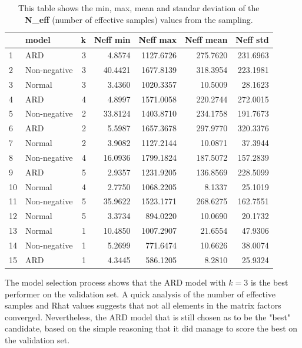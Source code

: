 \documentclass[12pt]{article}
\begin{document}
    \begin{table}[H]
        \centering
        \caption{This table shows the min, max, mean and standar deviation of the \textbf{N\_eff} (number of effective samples) values from the sampling.}
        \begin{tabular}{llr|rr|rr}
            \toprule
            {} &         model &  k &  Neff min &  Neff max &  Neff mean &  Neff std \\
            \midrule
            1  &           ARD &  3 &    4.8574 & 1127.6726 &   275.7620 &  231.6963 \\
            2  &  Non-negative &  3 &   40.4421 & 1677.8139 &   318.3954 &  223.1981 \\
            3  &        Normal &  3 &    3.4360 & 1020.3357 &    10.5009 &   28.1623 \\
            4  &           ARD &  4 &    4.8997 & 1571.0058 &   220.2744 &  272.0015 \\
            5  &  Non-negative &  2 &   33.8124 & 1403.8710 &   234.1758 &  191.7673 \\
            6  &           ARD &  2 &    5.5987 & 1657.3678 &   297.9770 &  320.3376 \\
            7  &        Normal &  2 &    3.9082 & 1127.2144 &    10.0871 &   37.3944 \\
            8  &  Non-negative &  4 &   16.0936 & 1799.1824 &   187.5072 &  157.2839 \\
            9  &           ARD &  5 &    2.9357 & 1231.9205 &   136.8569 &  228.5099 \\
            10 &        Normal &  4 &    2.7750 & 1068.2205 &     8.1337 &   25.1019 \\
            11 &  Non-negative &  5 &   35.9622 & 1523.1771 &   268.6275 &  162.7551 \\
            12 &        Normal &  5 &    3.3734 &  894.0220 &    10.0690 &   20.1732 \\
            13 &        Normal &  1 &   10.4850 & 1007.2907 &    21.6554 &   47.9306 \\
            14 &  Non-negative &  1 &    5.2699 &  771.6474 &    10.6626 &   38.0074 \\
            15 &           ARD &  1 &    4.3445 &  586.1205 &     8.2810 &   25.9324 \\
            \bottomrule
        \end{tabular}
    \end{table}

    The model selection process shows that the ARD model with $k=3$ is the best performer on the validation set. A quick analysis of the number of effective samples and Rhat values suggests that not all elements in the matrix factors converged. Nevertheless, the ARD model that is still chosen as to be the "best" candidate, based on the simple reasoning that it did manage to score the best on the validation set.

% 


\end{document}
